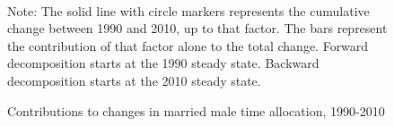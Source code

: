 \documentclass[12pt]{article}
\newcommand{\note}[1]{\caption*{Note: {#1}} }
\begin{document}
\begin{figure}[hp]
	\centering
	\caption{Contributions to changes in married male time allocation, 1990-2010}\label{fig:decomp_ta_m}
	\\
	\note{The solid line with circle markers represents the cumulative change between 1990 and 2010, up to that factor. The bars represent the contribution of that factor alone to the total change. Forward decomposition starts at the 1990 steady state. Backward decomposition starts at the 2010 steady state.}
\end{figure}
\end{document}
